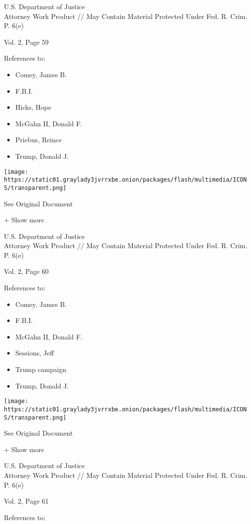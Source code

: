 U.S. Department of Justice\\
Attorney Work Product // May Contain Material Protected Under Fed. R.
Crim. P. 6(e)

Vol. 2, Page 59

References to:

\begin{itemize}
\tightlist
\item
  Comey, James B.
\item
  F.B.I.
\item
  Hicks, Hope
\item
  McGahn II, Donald F.
\item
  Priebus, Reince
\item
  Trump, Donald J.
\end{itemize}

\protect\hyperlink{}{}

\texttt{[image: https://static01.graylady3jvrrxbe.onion/packages/flash/multimedia/ICONS/transparent.png]}

See Original Document

+ Show more

U.S. Department of Justice\\
Attorney Work Product // May Contain Material Protected Under Fed. R.
Crim. P. 6(e)

Vol. 2, Page 60

References to:

\begin{itemize}
\tightlist
\item
  Comey, James B.
\item
  F.B.I.
\item
  McGahn II, Donald F.
\item
  Sessions, Jeff
\item
  Trump campaign
\item
  Trump, Donald J.
\end{itemize}

\protect\hyperlink{}{}

\texttt{[image: https://static01.graylady3jvrrxbe.onion/packages/flash/multimedia/ICONS/transparent.png]}

See Original Document

+ Show more

U.S. Department of Justice\\
Attorney Work Product // May Contain Material Protected Under Fed. R.
Crim. P. 6(e)

Vol. 2, Page 61

References to:


